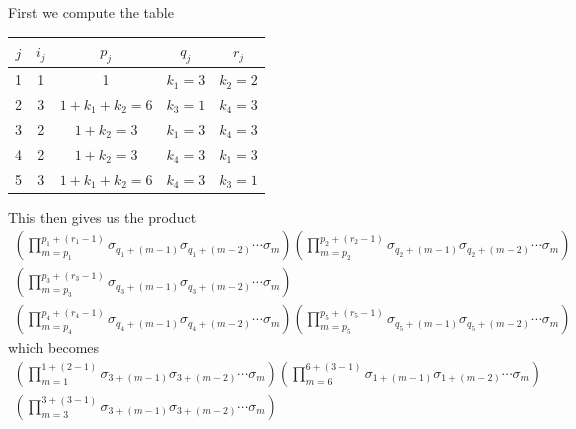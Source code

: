 \begin{example}
    First we compute the table 
    \begin{center}
        \begin{tabular}{|c|c |c| c| c|} 
            \hline
            $j$ & $i_{j}$ & $p_j$ & $q_j$ & $r_j$ \\ [0.5ex] 
            \hline
            1 & 1 & 1 &$k_1 = 3$ & $k_2 = 2$ \\ 
            \hline
            2 & 3 & $1 + k_1 + k_2 = 6$ & $k_3 = 1$ & $k_4 = 3$ \\
            \hline
            3 & 2 & $1 + k_2 = 3$ & $k_1 = 3$ & $k_4 = 3$ \\
            \hline
            4 & 2 & $1 + k_2 = 3$ & $k_4 = 3$ & $k_1 = 3$ \\
            \hline
            5 & 3 & $1 + k_1 + k_2 = 6$ & $k_4 = 3$ & $k_3 = 1$ \\ [1ex] 
            \hline
           \end{tabular}
    \end{center}
    This then gives us the product 
    \begin{gather*}
        \left(\prod_{m = p_1}^{p_1 + (r_1-1)}
        \sigma_{q_1 + (m-1)}
        \sigma_{q_1 + (m-2)}
        \cdots 
        \sigma_{m}\right)
        \left(\prod_{m = p_2}^{p_2 + (r_2-1)}
        \sigma_{q_2 + (m-1)}
        \sigma_{q_2 + (m-2)}
        \cdots 
        \sigma_{m} \right)
        \\
        \left(     \prod_{m = p_3}^{p_3 + (r_3-1)}
        \sigma_{q_3 + (m-1)}
        \sigma_{q_3 + (m-2)}
        \cdots 
        \sigma_{m} \right)
        \\
        \left(    \prod_{m = p_4}^{p_4 + (r_4-1)}
        \sigma_{q_4 + (m-1)}
        \sigma_{q_4 + (m-2)}
        \cdots 
        \sigma_{m} \right)
        \left(     \prod_{m = p_5}^{p_5 + (r_5-1)}
        \sigma_{q_5 + (m-1)}
        \sigma_{q_5 + (m-2)}
        \cdots 
        \sigma_{m} \right)
    \end{gather*}
    which becomes 
    \begin{gather*}
        \left(\prod_{m = 1}^{1 + (2-1)}
        \sigma_{3 + (m-1)}
        \sigma_{3 + (m-2)}
        \cdots 
        \sigma_{m}\right)
        \left(\prod_{m = 6}^{6 + (3-1)}
        \sigma_{1 + (m-1)}
        \sigma_{1 + (m-2)}
        \cdots 
        \sigma_{m} \right)
        \\
        \left(     \prod_{m = 3}^{3 + (3-1)}
        \sigma_{3 + (m-1)}
        \sigma_{3 + (m-2)}
        \cdots 
        \sigma_{m} \right)
        \\

\end{gather*}
\end{example}
